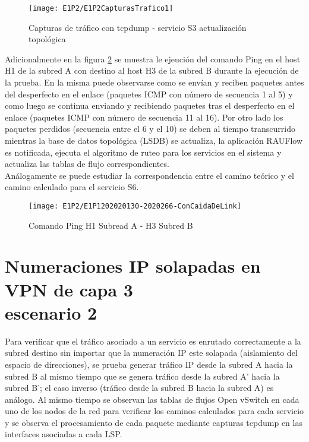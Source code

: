 \newpage
\begin{figure}[ht!] 
\centering    
\texttt{[image: E1P2/E1P2CapturasTrafico1]}
\caption[Capturas de tr\'afico con tcpdump - servicio S3 actualización topol\'ogica]{Capturas de tr\'afico con tcpdump - servicio S3 actualización topol\'ogica}
\label{fig:LabE1P1CapsTraf3}
\end{figure}

Adicionalmente en la figura \ref{fig:LabE1P2CapHost} se muestra le ejeuci\'on del comando Ping en el host H1 de la subred A con destino al host H3 de la subred B durante la ejecuci\'on de la prueba. En la misma puede observarse como se envían y reciben paquetes antes del desperfecto en el enlace (paquetes ICMP con n\'umero de secuencia 1 al 5) y como luego se continua enviando y recibiendo paquetes tras el desperfecto en el enlace (paquetes ICMP con n\'umero de secuencia 11 al 16). Por otro lado los paquetes perdidos (secuencia entre el 6 y el 10) se deben al tiempo transcurrido mientras la base de datos topol\'ogica (LSDB) se actualiza, la aplicaci\'on RAUFlow es notificada, ejecuta el algoritmo de ruteo para los servicios en el sistema y actualiza las tablas de flujo correspondientes.   \\

Análogamente se puede estudiar la correspondencia entre el camino te\'orico y el camino calculado para el servicio S6.\\

\begin{figure}[ht!] 
\centering    
\texttt{[image: E1P2/E1P1202020130-2020266-ConCaidaDeLink]}
\caption[Comando Ping H1 Subread A - H3 Subred B]{Comando Ping H1 Subread A - H3 Subred B}
\label{fig:LabE1P2CapHost}
\end{figure}

\section{Numeraciones IP solapadas en VPN de capa 3 \\ escenario 2}
\label{appendix6.4}
Para verificar que el tr\'afico asociado a un servicio es enrutado correctamente a la subred destino sin importar que la numeración IP este solapada (aislamiento del espacio de direcciones), se prueba generar tr\'afico IP desde la subred A hacia la subred B al mismo tiempo que se genera tr\'afico desde la subred A' hacia la subred B'; el caso inverso (tr\'afico desde la subred B hacia la subred A) es an\'alogo. Al mismo tiempo se observan las tablas de flujos Open vSwitch en cada uno de los nodos de la red para verificar los caminos calculados para cada servicio y se observa el procesamiento de cada paquete mediante capturas tcpdump en las interfaces asociadas a cada LSP.\\

